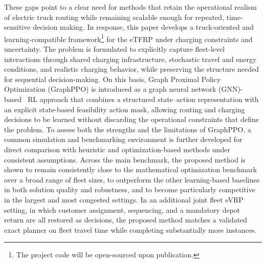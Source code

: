 \documentclass[a4paper,fleqn]{cas-sc}
\begin{document}
These gaps point to a clear need for methods that retain the operational realism of electric truck routing while remaining scalable enough for repeated, time-sensitive decision making. In response, this paper develops a truck-oriented and learning-compatible framework\footnote{The project code will be open-sourced upon publication.}
for the eTFRP under charging constraints and uncertainty. The problem is formulated to explicitly capture fleet-level interactions through shared charging infrastructure, stochastic travel and energy conditions, and realistic charging behavior, while preserving the structure needed for sequential decision-making. On this basis, Graph Proximal Policy Optimization (GraphPPO) is introduced as a graph neural network (GNN)-based~\cite{kipf} RL approach that combines a structured state--action representation with an explicit state-based feasibility action mask, allowing routing and charging decisions to be learned without discarding the operational constraints that define the problem. To assess both the strengths and the limitations of GraphPPO, a common simulation and benchmarking environment is further developed for direct comparison with heuristic and optimization-based methods under consistent assumptions. Across the main benchmark, the proposed method is shown to remain consistently close to the mathematical optimization benchmark over a broad range of fleet sizes, to outperform the other learning-based baselines in both solution quality and robustness, and to become particularly competitive in the largest and most congested settings. In an additional joint fleet eVRP setting, in which customer assignment, sequencing, and a mandatory depot return are all restored as decisions, the proposed method matches a validated exact planner on fleet travel time while completing substantially more instances.
\end{document}
